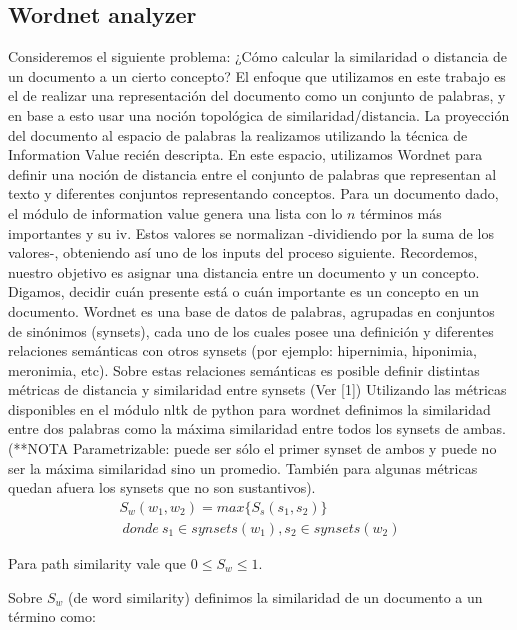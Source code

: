 \documentclass{pnastwo}
\begin{document}
\begin{article}
\subsection{Wordnet analyzer}
Consideremos el siguiente problema:
\newline
¿Cómo calcular la similaridad o distancia de un documento a un cierto concepto? 
\newline
El enfoque que utilizamos en este trabajo es el de realizar una representación del documento como un conjunto de palabras, y en base a esto usar una noción topológica de similaridad/distancia. La proyección del documento al espacio de palabras la realizamos utilizando la t\'ecnica de Information Value reci\'en descripta.
En este espacio, utilizamos Wordnet para definir una noción de distancia entre el conjunto de palabras que representan al texto y diferentes conjuntos representando conceptos.
\newline
Para un documento dado, el módulo de information value genera una lista con lo $n$ términos más importantes y su iv. Estos valores se normalizan -dividiendo por la suma de los valores-, obteniendo así uno de los inputs del proceso siguiente. Recordemos, nuestro objetivo es asignar una distancia entre un documento y un concepto. Digamos, decidir cuán presente está o cuán importante es un concepto en un documento.
\newline
Wordnet es una base de datos de palabras, agrupadas en conjuntos de sinónimos (synsets), cada uno de los cuales posee una definición y diferentes relaciones semánticas con otros synsets (por ejemplo: hipernimia, hiponimia, meronimia, etc). Sobre estas relaciones semánticas es posible definir distintas métricas de distancia y similaridad entre synsets (Ver [1])
\newline
Utilizando las métricas disponibles en el módulo nltk de python para wordnet definimos la similaridad entre dos palabras como la máxima similaridad entre todos los synsets de ambas. (**NOTA Parametrizable: puede ser sólo el primer synset de ambos y puede no ser la máxima similaridad sino un promedio. También para algunas métricas quedan afuera los synsets que no son sustantivos). 
\begin{multline}
S_w(w_1, w_2) = max \{ S_s(s_1, s_2) \}\\\ donde\ s_1 \in synsets(w_1), s_2 \in synsets(w_2)
\end{multline}

Para path similarity vale que $0 \leq S_w \leq 1$. 

Sobre $S_w$ (de word similarity) definimos la similaridad de un documento a un término como:


\end{article}
\end{document}
